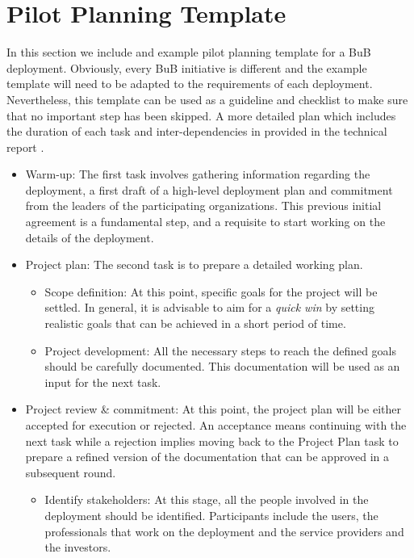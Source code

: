 \documentclass[conference]{IEEEtran}
\begin{document}
\section{Pilot Planning Template}
\label{sec:planning}
In this section we include and example pilot planning template for a BuB deployment. 
Obviously, every BuB initiative is different and the example template will need to be adapted to the requirements of each deployment.
Nevertheless, this template can be used as a guideline and checklist to make sure that no important step has been skipped.
A more detailed plan which includes the duration of each task and inter-dependencies in provided in the technical report \cite{barcelo2012bpp}.


\begin{itemize}
  \item{Warm-up:} 
  The first task involves gathering information regarding the deployment, a first draft of a high-level deployment plan and commitment from the leaders of the participating organizations.
  This previous initial agreement is a fundamental step, and a requisite to start working on the details of the deployment.
  \item{Project plan:}
  The second task is to prepare a detailed working plan.
  \begin{itemize}
    \item{Scope definition:}
    At this point, specific goals for the project will be settled.
    In general, it is advisable to aim for a \emph{quick win} by setting realistic goals that can be achieved in a short period of time.
    \item{Project development:}
    All the necessary steps to reach the defined goals should be carefully documented.
    This documentation will be used as an input for the next task.
  \end{itemize}
  \item{Project review \& commitment:}
  At this point, the project plan will be either accepted for execution or rejected.
  An acceptance means continuing with the next task while a rejection implies moving back to the Project Plan task to prepare a refined version of the documentation that can be approved in a subsequent round.
  \begin{itemize}
    \item{Identify stakeholders:}
    At this stage, all the people involved in the deployment should be identified.
    Participants include the users, the professionals that work on the deployment and the service providers and the investors.

\end{itemize}
\end{itemize}
\end{document}
